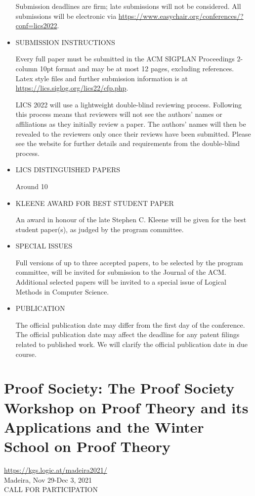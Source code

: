 \documentclass[prodmode,acmtecs]{acmsmall} %
\begin{document}
\begin{itemize}
  Submission deadlines are firm; late submissions will not be considered. All submissions will be electronic via \href{https://www.easychair.org/conferences/?conf=lics2022}{https://www.easychair.org/conferences/?conf=lics2022}. 
 
\item  SUBMISSION INSTRUCTIONS 
 
  Every full paper must be submitted in the ACM SIGPLAN Proceedings 2-column 10pt format and may be at most 12 pages, excluding references. Latex style files and further submission information is at \href{https://lics.siglog.org/lics22/cfp.php}{https://lics.siglog.org/lics22/cfp.php}.  
 
  LICS 2022 will use a lightweight double-blind reviewing process. Following this process means that reviewers will not see the authors’ names or affiliations as they initially review a paper. The authors’ names will then be revealed to the reviewers only once their reviews have been submitted. Please see the website for further details and requirements from the double-blind process. 
 
\item  LICS DISTINGUISHED PAPERS  
 
  Around 10%
 
\item  KLEENE AWARD FOR BEST STUDENT PAPER 
 
  An award in honour of the late Stephen C. Kleene will be given for the best student paper(s), as judged by the program committee. 
 
\item  SPECIAL ISSUES 
 
  Full versions of up to three accepted papers, to be selected by the program committee, will be invited for submission to the Journal of the ACM. Additional selected papers will be invited to a special issue of Logical Methods in Computer Science. 
 
\item  PUBLICATION 
 
  The official publication date may differ from the first day of the conference. The official publication date may affect the deadline for any patent filings related to published work. We will clarify the official publication date in due course. 
 
\end{itemize}\section{Proof Society: The Proof Society Workshop on Proof Theory and its Applications and the Winter School on Proof Theory}\label{ProofSociety}  \href{https://kgs.logic.at/madeira2021/}{https://kgs.logic.at/madeira2021/}\\ 
  Madeira, Nov 29-Dec 3, 2021 \\ 
CALL FOR PARTICIPATION 
\end{document}
